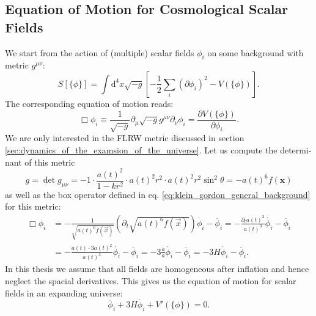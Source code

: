 \documentclass[master,       %
               twoside,        %
               BCOR10mm,       %
               english,ngerman, %
               ]{GAUBM}
\begin{document}
\begin{otherlanguage}{english}
\subsection{Equation of Motion for Cosmological Scalar Fields}
We start from the action of (multiple) scalar fields $\phi_i$ on some background with metric $g^{\mu \nu}$:
\begin{equation}
	S[\{\phi\}] = \int \mathrm{d}^4 x \sqrt{-g} \left[- \frac{1}{2} \sum_i (\partial \phi_i)^2 - V(\{\phi\}) \right].
\end{equation}
The corresponding equation of motion reads:
\begin{equation}
	\label{eq:klein_gordon_general_background}
	\Box \phi_i \equiv \frac{1}{\sqrt{-g}} \partial_\mu \sqrt{-g} g^{\mu \nu} \partial_\nu \phi_i = \frac{\partial V(\{\phi\})}{\partial \phi_i}.
\end{equation}
We are only interested in the FLRW metric discussed in section \ref{sec:dynamics_of_the_examsion_of_the_universe}.
Let us compute the determinant of this metric
\begin{equation}
	g = \det g_{\mu \nu} = -1 \cdot \frac{a(t)^2}{1 - kr^2} \cdot a(t)^2 r^2 \cdot a(t)^2 r^2 \sin^2 \theta = - a(t)^6 f(\mathbf{x})
\end{equation}
as well as the box operator defined in eq. \eqref{eq:klein_gordon_general_background} for this metric:
\begin{align}
	    \Box \phi_i
	    &= - \frac{1}{\sqrt{a(t)^6 f(\vec{x})}} (\partial_t \sqrt{ a(t)^6 f(\vec{x}) }) \dot{\phi_i} - \ddot{\phi_i}
	    = - \frac{\partial_t a(t)^3}{a(t)^3} \dot{\phi_i} - \ddot{\phi_i} \nonumber \\
	    &= - \frac{\dot{a}(t) \cdot 3 a(t)^2}{a(t)^3} \dot{\phi_i} - \ddot{\phi_i}
	    = - 3 \frac{\dot{a}}{a} \dot{\phi_i} - \ddot{\phi_i}
	    = - 3H \dot{\phi_i} - \ddot{\phi_i}.
\end{align}
In this thesis we assume that all fields are homogeneous after inflation and hence neglect the spacial derivatives.
This gives us the equation of motion for scalar fields in an expanding universe:
\begin{equation}
	\label{eq:scalar_field_eom}
	\boxed{
	\ddot{\phi_i} + 3 H \dot{\phi_i} + V'(\{\phi\}) = 0.
	}
\end{equation}


\end{otherlanguage}
\end{document}
